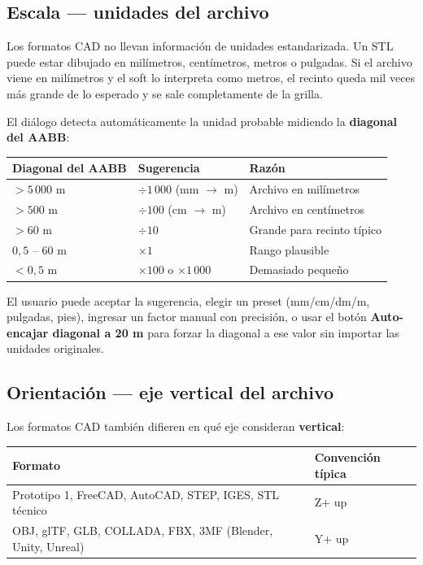 \documentclass[11pt, a4paper]{article}
\newcommand{\menu}[1]{\textbf{\guillemotleft #1\guillemotright}}
\begin{document}
\subsection{Escala — unidades del archivo}

Los formatos CAD no llevan información de unidades estandarizada. Un STL
puede estar dibujado en milímetros, centímetros, metros o pulgadas. Si el
archivo viene en milímetros y el soft lo interpreta como metros, el
recinto queda mil veces más grande de lo esperado y se sale completamente
de la grilla.

El diálogo detecta automáticamente la unidad probable midiendo la
\textbf{diagonal del AABB}:

\vspace{0.3em}
\begin{tabular}{lll}
  \toprule
  \textbf{Diagonal del AABB} & \textbf{Sugerencia} & \textbf{Razón} \\
  \midrule
  $> 5\,000$ m  & $\div 1\,000$ (mm $\to$ m) & Archivo en milímetros \\
  $> 500$ m     & $\div 100$ (cm $\to$ m)   & Archivo en centímetros \\
  $> 60$ m      & $\div 10$                  & Grande para recinto típico \\
  $0{,}5$ -- $60$ m & $\times 1$            & Rango plausible \\
  $< 0{,}5$ m   & $\times 100$ o $\times 1\,000$ & Demasiado pequeño \\
  \bottomrule
\end{tabular}

\vspace{0.4em}
El usuario puede aceptar la sugerencia, elegir un preset (mm/cm/dm/m,
pulgadas, pies), ingresar un factor manual con precisión, o usar el
botón \menu{Auto-encajar diagonal a 20 m} para forzar la diagonal a ese
valor sin importar las unidades originales.

\subsection{Orientación — eje vertical del archivo}

Los formatos CAD también difieren en qué eje consideran \textbf{vertical}:

\vspace{0.3em}
\begin{tabular}{ll}
  \toprule
  \textbf{Formato} & \textbf{Convención típica} \\
  \midrule
  Prototipo 1, FreeCAD, AutoCAD, STEP, IGES, STL técnico & Z$+$ up \\
  OBJ, glTF, GLB, COLLADA, FBX, 3MF (Blender, Unity, Unreal) & Y$+$ up \\
  \bottomrule
\end{tabular}
\end{document}
